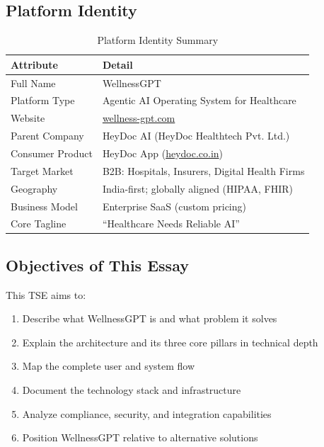 \documentclass[12pt,a4paper]{article}
\begin{document}
\subsection{Platform Identity}

\begin{table}[H]
\centering
\renewcommand{\arraystretch}{1.4}
\begin{tabularx}{\textwidth}{lX}
\toprule
\textbf{Attribute} & \textbf{Detail} \\
\midrule
Full Name            & WellnessGPT \\
Platform Type        & Agentic AI Operating System for Healthcare \\
Website              & \href{https://wellness-gpt.com}{wellness-gpt.com} \\
Parent Company       & HeyDoc AI (HeyDoc Healthtech Pvt. Ltd.) \\
Consumer Product     & HeyDoc App (\href{https://heydoc.co.in}{heydoc.co.in}) \\
Target Market        & B2B: Hospitals, Insurers, Digital Health Firms \\
Geography            & India-first; globally aligned (HIPAA, FHIR) \\
Business Model       & Enterprise SaaS (custom pricing) \\
Core Tagline         & ``Healthcare Needs Reliable AI'' \\
\bottomrule
\end{tabularx}
\caption{Platform Identity Summary}
\end{table}

\subsection{Objectives of This Essay}

This TSE aims to:
\begin{enumerate}[noitemsep]
    \item Describe what WellnessGPT is and what problem it solves
    \item Explain the architecture and its three core pillars in technical depth
    \item Map the complete user and system flow
    \item Document the technology stack and infrastructure
    \item Analyze compliance, security, and integration capabilities
    \item Position WellnessGPT relative to alternative solutions
\end{enumerate}
\end{document}
